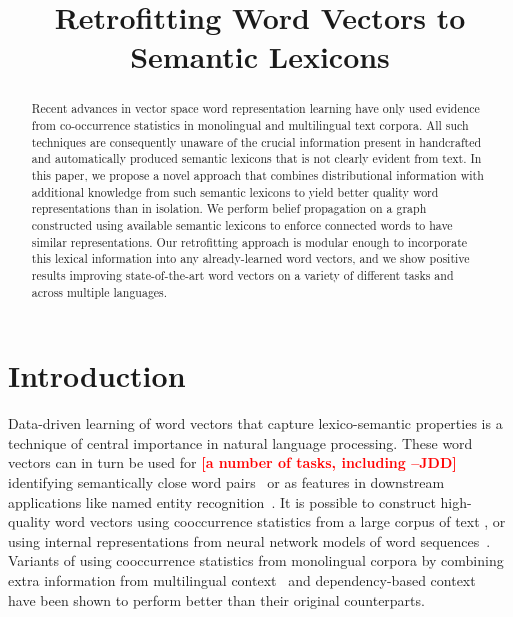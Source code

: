 \documentclass[11pt]{article}
\title{Retrofitting Word Vectors to Semantic Lexicons}
\newcommand{\jdd}[1]{\textcolor{red}{\bf\small [#1 --JDD]}}
\begin{document}
\maketitle
\begin{abstract}
  Recent advances in vector space word representation learning have
  only used evidence from co-occurrence statistics in
  monolingual and multilingual text corpora. All such techniques are 
  consequently unaware of the
  crucial information present in handcrafted and automatically
  produced semantic lexicons that is not clearly evident from text. In this 
  paper, we propose a novel approach that combines distributional 
  information with additional knowledge from such semantic lexicons to 
  yield better quality word representations
  than in isolation. We perform belief propagation on a graph constructed
  using available semantic lexicons to enforce connected words to
  have similar representations. Our retrofitting approach is modular enough to incorporate this lexical information into any already-learned word vectors, and we show positive results improving state-of-the-art word vectors on a variety of different tasks and across multiple languages.
\end{abstract}

\section{Introduction}
\label{sec:intro}

Data-driven learning of word vectors that capture lexico-semantic 
properties is a technique of central importance in natural language processing. 
These word vectors can in turn be used for \jdd{a number of tasks, including} identifying semantically close word 
pairs~\cite{Turney:2006:SSR:1174520.1174523,Agirre:2009:SSR:1620754.1620758} or as features
in downstream applications like named entity recognition~\cite{turian:2010}.
It is possible to construct high-quality word vectors using cooccurrence 
statistics from a large corpus of text 
\cite{deerwester-90}, or using internal representations from neural 
network models of word sequences~\cite{Collobert:2008:UAN:1390156.1390177}.
Variants of using cooccurrence statistics from monolingual corpora by combining
extra information from
multilingual context~\cite{zou-EtAl:2013:EMNLP,hermann2014multilingual,faruqui-dyer:2014:EACL2014}
and dependency-based context~\cite{Pado:2007:DCS:1268656.1268658}
have been shown to perform better than their original counterparts. 
\end{document}
